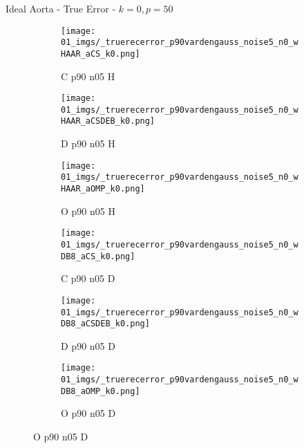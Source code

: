 \begin{frame}{Ideal Aorta - True Error - $k=0,p=50$}{}
\begin{figure}
\begin{subfigure}{0.13\textwidth}
\texttt{[image: 01\_imgs/\_truerecerror\_p90vardengauss\_noise5\_n0\_wHAAR\_aCS\_k0.png]}
\caption*{\tiny C p90 n05 H}
\end{subfigure}
\begin{subfigure}{0.13\textwidth}
\texttt{[image: 01\_imgs/\_truerecerror\_p90vardengauss\_noise5\_n0\_wHAAR\_aCSDEB\_k0.png]}
\caption*{\tiny D p90 n05 H}
\end{subfigure}
\begin{subfigure}{0.13\textwidth}
\texttt{[image: 01\_imgs/\_truerecerror\_p90vardengauss\_noise5\_n0\_wHAAR\_aOMP\_k0.png]}
\caption*{\tiny O p90 n05 H}
\end{subfigure}
\begin{subfigure}{0.13\textwidth}
\texttt{[image: 01\_imgs/\_truerecerror\_p90vardengauss\_noise5\_n0\_wDB8\_aCS\_k0.png]}
\caption*{\tiny C p90 n05 D}
\end{subfigure}
\begin{subfigure}{0.13\textwidth}
\texttt{[image: 01\_imgs/\_truerecerror\_p90vardengauss\_noise5\_n0\_wDB8\_aCSDEB\_k0.png]}
\caption*{\tiny D p90 n05 D}
\end{subfigure}
\begin{subfigure}{0.13\textwidth}
\texttt{[image: 01\_imgs/\_truerecerror\_p90vardengauss\_noise5\_n0\_wDB8\_aOMP\_k0.png]}
\caption*{\tiny O p90 n05 D}
\end{subfigure}

\vspace{5pt}


\end{figure}
\end{frame}
